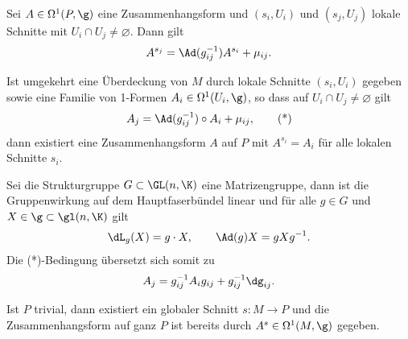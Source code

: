 \documentclass[%
	paper=a5,%
	fleqn,%
	DIV=18,%
	BCOR=0mm,
	fontsize=11pt,
	titlepage=false,%
	bibliography=totoc,
	DIV=18,%
	twoside=true,
	pdftitle=Riemannsche Geometrie,
	pdfauthor=Uwe Semmelmann,
	numbers=noendperiod]%
	{scrbook}
\begin{document}
\begin{prop}
\begin{propenum}
\item
Sei $A\in \Omega^1(P,\g)$ eine Zusammenhangsform und $(s_i,U_i)$ und $(s_j,U_j)$
lokale Schnitte mit $U_i\cap U_j\neq \varnothing$. Dann gilt
\begin{align*}
A^{s_j} = \Ad(g_{ij}^{-1})A^{s_i} + \mu_{ij}.
\end{align*}
\item Ist umgekehrt eine Überdeckung von $M$ durch lokale Schnitte $(s_i,U_i)$
gegeben sowie eine Familie von 1-Formen $A_i\in \Omega^1(U_i,\g)$, so dass auf
$U_i\cap U_j\neq \varnothing$ gilt
\begin{align*}
A_j = \Ad(g_{ij}^{-1})\circ A_i + \mu_{ij},\tag{*}
\end{align*}
dann existiert eine Zusammenhangsform $A$ auf $P$ mit $A^{s_i} = A_i$ für alle
lokalen Schnitte $s_i$.\fish
\end{propenum}
\end{prop}

\begin{rem}[Spezialfälle.]
\begin{remenum}
\item Sei die Strukturgruppe $G\subset \GL(n,\K)$ eine Matrizengruppe, dann ist
die Gruppenwirkung auf dem Hauptfaserbündel linear und für alle $g\in G$ und
$X\in\g \subset \gl(n,\K)$ gilt
\begin{align*}
\dL_g(X) = g\cdot X,\qquad \Ad(g)X = gXg^{-1}.
\end{align*}
Die (*)-Bedingung übersetzt sich somit zu
\begin{align*}
A_j = g_{ij}^{-1}A_i g_{ij} + g_{ij}^{-1}\dg_{ij}.
\end{align*}
\item Ist $P$ trivial, dann existiert ein globaler Schnitt $s: M\to P$ und die
Zusammenhangsform auf ganz $P$ ist bereits  durch $A^s\in
\Omega^1(M,\g)$ gegeben.\map
\end{remenum}
\end{rem}
\end{document}
